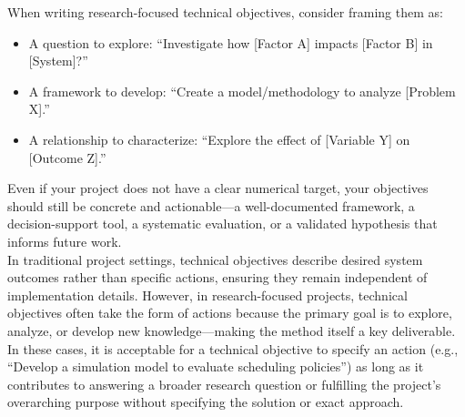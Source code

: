 \documentclass[12pt]{article}
\begin{document}
When writing research-focused technical objectives, consider framing them as:

\begin{itemize}[leftmargin=1.5cm]
    \item A question to explore: ``Investigate how [Factor A] impacts [Factor B] in [System]?''
    \item A framework to develop: ``Create a model/methodology to analyze [Problem X].''
    \item A relationship to characterize: ``Explore the effect of [Variable Y] on [Outcome Z].''
\end{itemize}

Even if your project does not have a clear numerical target, your objectives should still be concrete and actionable—a well-documented framework, a decision-support tool, a systematic evaluation, or a validated hypothesis that informs future work.\\

In traditional project settings, technical objectives describe desired system outcomes rather than specific actions, ensuring they remain independent of implementation details. However, in research-focused projects, technical objectives often take the form of actions because the primary goal is to explore, analyze, or develop new knowledge—making the method itself a key deliverable.\\

In these cases, it is acceptable for a technical objective to specify an action (e.g., ``Develop a simulation model to evaluate scheduling policies'') as long as it contributes to answering a broader research question or fulfilling the project’s overarching purpose without specifying the solution or exact approach.
\end{document}
